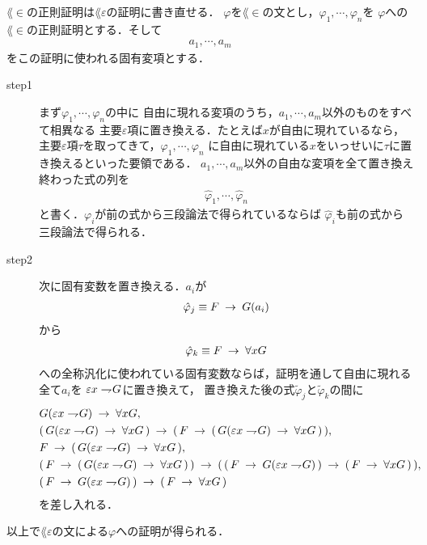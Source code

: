 	$\lang{\in}$の正則証明は$\lang{\varepsilon}$の証明に書き直せる．
	$\varphi$を$\lang{\in}$の文とし，$\varphi_{1},\cdots,\varphi_{n}$を
	$\varphi$への$\lang{\in}$の正則証明とする．そして
	\begin{align}
		a_{1},\cdots,a_{m}
	\end{align}
	をこの証明に使われる固有変項とする．
	\begin{description}
		\item[step1]
			まず$\varphi_{1},\cdots,\varphi_{n}$の中に
			自由に現れる変項のうち，$a_{1},\cdots,a_{m}$以外のものをすべて相異なる
			主要$\varepsilon$項に置き換える．たとえば$x$が自由に現れているなら，
			主要$\varepsilon$項$\tau$を取ってきて，$\varphi_{1},\cdots,\varphi_{n}$
			に自由に現れている$x$をいっせいに$\tau$に置き換えるといった要領である．
			$a_{1},\cdots,a_{m}$以外の自由な変項を全て置き換え終わった式の列を
			\begin{align}
				\hat{\varphi}_{1}, \cdots, \hat{\varphi}_{n}
			\end{align}
			と書く．$\varphi_{i}$が前の式から三段論法で得られているならば
			$\hat{\varphi}_{i}$も前の式から三段論法で得られる．
			
		\item[step2]
			次に固有変数を置き換える．$a_{i}$が
			\begin{align}
				\hat{\varphi}_{j} \equiv F \hspace{0.25em}\rightarrow\hspace{0.25em} G(a_{i})
			\end{align}
			から
			\begin{align}
				\hat{\varphi}_{k} \equiv F \hspace{0.25em}\rightarrow\hspace{0.25em} \forall x G
			\end{align}
			への全称汎化に使われている固有変数ならば，証明を通して自由に現れる全て$a_{i}$を
			$\varepsilon x \rightharpoondown\hspace{-0.25em} G$に置き換えて，
			置き換えた後の式$\tilde{\varphi}_{j}$と$\tilde{\varphi}_{k}$の間に
			\begin{align}
				&G(\varepsilon x \rightharpoondown\hspace{-0.25em} G) \hspace{0.25em}\rightarrow\hspace{0.25em} \forall x G, \\
				&(\, G(\varepsilon x \rightharpoondown\hspace{-0.25em} G) \hspace{0.25em}\rightarrow\hspace{0.25em} \forall x G\, )
				\hspace{0.25em}\rightarrow\hspace{0.25em} (\, F \hspace{0.25em}\rightarrow\hspace{0.25em} (\, G(\varepsilon x \rightharpoondown\hspace{-0.25em} G) \hspace{0.25em}\rightarrow\hspace{0.25em} \forall x G\, )\, ), \\
				&F \hspace{0.25em}\rightarrow\hspace{0.25em} (\, G(\varepsilon x \rightharpoondown\hspace{-0.25em} G) \hspace{0.25em}\rightarrow\hspace{0.25em} \forall x G\, ), \\
				&(\, F \hspace{0.25em}\rightarrow\hspace{0.25em} (\, G(\varepsilon x \rightharpoondown\hspace{-0.25em} G) \hspace{0.25em}\rightarrow\hspace{0.25em} \forall x G\, )\, ) \hspace{0.25em}\rightarrow\hspace{0.25em}
				(\, (\, F \hspace{0.25em}\rightarrow\hspace{0.25em} G(\varepsilon x \rightharpoondown\hspace{-0.25em} G)\, ) \hspace{0.25em}\rightarrow\hspace{0.25em}
				(\, F \hspace{0.25em}\rightarrow\hspace{0.25em} \forall x G\, )\, ), \\
				&(\, F \hspace{0.25em}\rightarrow\hspace{0.25em} G(\varepsilon x \rightharpoondown\hspace{-0.25em} G)\, ) \hspace{0.25em}\rightarrow\hspace{0.25em}
				(\, F \hspace{0.25em}\rightarrow\hspace{0.25em} \forall x G\, )
			\end{align}
			を差し入れる．
	\end{description}
	以上で$\lang{\varepsilon}$の文による$\varphi$への証明が得られる．
	
